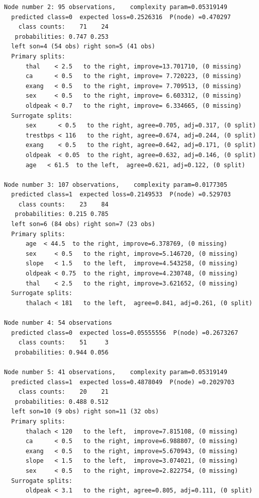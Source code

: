 \documentclass{article}
\begin{document}
\begin{lstlisting}
Node number 2: 95 observations,    complexity param=0.05319149
  predicted class=0  expected loss=0.2526316  P(node) =0.470297
    class counts:    71    24
   probabilities: 0.747 0.253 
  left son=4 (54 obs) right son=5 (41 obs)
  Primary splits:
      thal    < 2.5   to the right, improve=13.701710, (0 missing)
      ca      < 0.5   to the right, improve= 7.720223, (0 missing)
      exang   < 0.5   to the right, improve= 7.709513, (0 missing)
      sex     < 0.5   to the right, improve= 6.603312, (0 missing)
      oldpeak < 0.7   to the right, improve= 6.334665, (0 missing)
  Surrogate splits:
      sex      < 0.5   to the right, agree=0.705, adj=0.317, (0 split)
      trestbps < 116   to the right, agree=0.674, adj=0.244, (0 split)
      exang    < 0.5   to the right, agree=0.642, adj=0.171, (0 split)
      oldpeak  < 0.05  to the right, agree=0.632, adj=0.146, (0 split)
      age   < 61.5  to the left,  agree=0.621, adj=0.122, (0 split)

Node number 3: 107 observations,    complexity param=0.0177305
  predicted class=1  expected loss=0.2149533  P(node) =0.529703
    class counts:    23    84
   probabilities: 0.215 0.785 
  left son=6 (84 obs) right son=7 (23 obs)
  Primary splits:
      age  < 44.5  to the right, improve=6.378769, (0 missing)
      sex     < 0.5   to the right, improve=5.146720, (0 missing)
      slope   < 1.5   to the left,  improve=4.543258, (0 missing)
      oldpeak < 0.75  to the right, improve=4.230748, (0 missing)
      thal    < 2.5   to the right, improve=3.621652, (0 missing)
  Surrogate splits:
      thalach < 181   to the left,  agree=0.841, adj=0.261, (0 split)

Node number 4: 54 observations
  predicted class=0  expected loss=0.05555556  P(node) =0.2673267
    class counts:    51     3
   probabilities: 0.944 0.056 

Node number 5: 41 observations,    complexity param=0.05319149
  predicted class=1  expected loss=0.4878049  P(node) =0.2029703
    class counts:    20    21
   probabilities: 0.488 0.512 
  left son=10 (9 obs) right son=11 (32 obs)
  Primary splits:
      thalach < 120   to the left,  improve=7.815108, (0 missing)
      ca      < 0.5   to the right, improve=6.988807, (0 missing)
      exang   < 0.5   to the right, improve=5.670943, (0 missing)
      slope   < 1.5   to the left,  improve=3.074021, (0 missing)
      sex     < 0.5   to the right, improve=2.822754, (0 missing)
  Surrogate splits:
      oldpeak < 3.1   to the right, agree=0.805, adj=0.111, (0 split)


\end{lstlisting}
\end{document}
